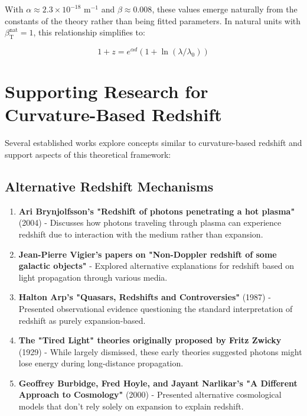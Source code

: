 \documentclass[12pt,a4paper]{article}
\newcommand{\betaT}{\beta_{\text{T}}}
\begin{document}
	With $\alpha \approx 2.3\times10^{-18}$ m$^{-1}$ and $\beta \approx 0.008$, these values emerge naturally from the constants of the theory rather than being fitted parameters\cite{pascher_params_2025}. In natural units with $\betaT^{\text{nat}} = 1$, this relationship simplifies to\cite{pascher_alphabeta_2025}:
	
	\begin{equation}
		\label{eq:natural_redshift}
		1 + z = e^{\alpha d}(1 + \ln(\lambda/\lambda_0))
	\end{equation}
	
	\section{Supporting Research for Curvature-Based Redshift}
	\label{sec:supporting_research}
	
	Several established works explore concepts similar to curvature-based redshift and support aspects of this theoretical framework:
	
	\subsection{Alternative Redshift Mechanisms}
	\label{subsec:alternative_redshift}
	
	\begin{enumerate}
		\item \textbf{Ari Brynjolfsson's "Redshift of photons penetrating a hot plasma"}\cite{brynjolfsson2004} (2004) - Discusses how photons traveling through plasma can experience redshift due to interaction with the medium rather than expansion.
		
		\item \textbf{Jean-Pierre Vigier's papers on "Non-Doppler redshift of some galactic objects"}\cite{vigier1990} - Explored alternative explanations for redshift based on light propagation through various media.
		
		\item \textbf{Halton Arp's "Quasars, Redshifts and Controversies"}\cite{arp1987} (1987) - Presented observational evidence questioning the standard interpretation of redshift as purely expansion-based.
		
		\item \textbf{The "Tired Light" theories originally proposed by Fritz Zwicky}\cite{zwicky1929} (1929) - While largely dismissed, these early theories suggested photons might lose energy during long-distance propagation.
		
		\item \textbf{Geoffrey Burbidge, Fred Hoyle, and Jayant Narlikar's "A Different Approach to Cosmology"}\cite{burbidge2000} (2000) - Presented alternative cosmological models that don't rely solely on expansion to explain redshift.
	\end{enumerate}
	
\end{document}
